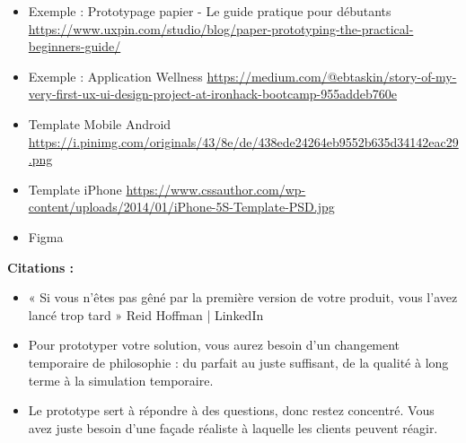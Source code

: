 \begin{itemize}
\item Exemple : Prototypage papier - Le guide pratique pour débutants \url{https://www.uxpin.com/studio/blog/paper-prototyping-the-practical-beginners-guide/}
\item Exemple : Application Wellness \url{https://medium.com/@ebtaskin/story-of-my-very-first-ux-ui-design-project-at-ironhack-bootcamp-955addeb760e}
\item Template Mobile Android \url{https://i.pinimg.com/originals/43/8e/de/438ede24264eb9552b635d34142eac29.png}
\item Template iPhone \url{https://www.cssauthor.com/wp-content/uploads/2014/01/iPhone-5S-Template-PSD.jpg}
\item Figma
\end{itemize}

\textbf{Citations :}

\begin{itemize}
\item « Si vous n'êtes pas gêné par la première version de votre produit, vous l'avez lancé trop tard » Reid Hoffman | LinkedIn
\item Pour prototyper votre solution, vous aurez besoin d'un changement temporaire de philosophie : du parfait au juste suffisant, de la qualité à long terme à la simulation temporaire.
\item Le prototype sert à répondre à des questions, donc restez concentré. Vous avez juste besoin d'une façade réaliste à laquelle les clients peuvent réagir.
\end{itemize}

